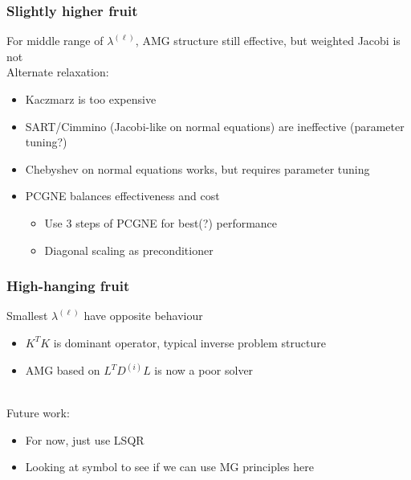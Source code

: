 \documentclass[12pt,t,xcolor=dvipsnames]{beamer}
\begin{document}
\begin{frame}
  \frametitle{Slightly higher fruit}

  For middle range of $\lambda^{(\ell)}$, AMG structure still
  effective, but weighted Jacobi is not \\[12pt]

  Alternate relaxation:
  \begin{itemize}
  \item Kaczmarz is too expensive
  \item SART/Cimmino (Jacobi-like on normal equations) are
    ineffective (parameter tuning?)
  \item Chebyshev on normal equations works, but requires parameter tuning
  \item PCGNE balances effectiveness and cost
    \begin{itemize}
    \item Use 3 steps of PCGNE for best(?) performance
      \item Diagonal scaling as preconditioner
    \end{itemize}
    
  \end{itemize}

\end{frame}

\begin{frame}
\frametitle{High-hanging fruit}
Smallest $\lambda^{(\ell)}$ have opposite behaviour
\begin{itemize}
\item $K^TK$ is dominant operator, typical inverse problem structure
\item AMG based on $L^TD^{(i)}L$ is now a poor solver
\end{itemize}
\ \\[12pt]

Future work:
\begin{itemize}
\item For now, just use LSQR
\item Looking at symbol to see if we can use MG principles here
  
\end{itemize}


\end{frame}
\end{document}

